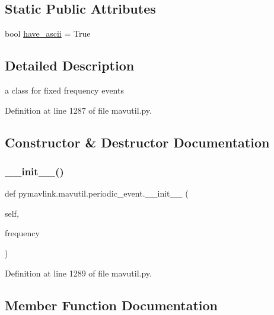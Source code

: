 \subsection*{Static Public Attributes}
\begin{DoxyCompactItemize}
\item 
bool \mbox{\hyperlink{classpymavlink_1_1mavutil_1_1periodic__event_a13096fa6189e3999bcf9f4d881f269e0}{have\+\_\+ascii}} = True
\end{DoxyCompactItemize}


\subsection{Detailed Description}
\begin{DoxyVerb}a class for fixed frequency events\end{DoxyVerb}
 

Definition at line 1287 of file mavutil.\+py.



\subsection{Constructor \& Destructor Documentation}
\mbox{\label{classpymavlink_1_1mavutil_1_1periodic__event_af45cf18064b3defb11eb5581b101be7e}} 
\subsubsection{\texorpdfstring{\_\_init\_\_()}{\_\_init\_\_()}}
{\footnotesize\ttfamily def pymavlink.\+mavutil.\+periodic\+\_\+event.\+\_\+\+\_\+init\+\_\+\+\_\+ (\begin{DoxyParamCaption}\item[{}]{self,  }\item[{}]{frequency }\end{DoxyParamCaption})}



Definition at line 1289 of file mavutil.\+py.



\subsection{Member Function Documentation}
\mbox{\label{classpymavlink_1_1mavutil_1_1periodic__event_a2a5504d296287adeb13b14a5476977ef}} 
